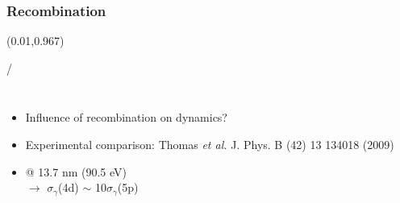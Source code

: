\documentclass{beamer}
\makeatletter
\newcommand{\framenumber}{
\begin{textblock}{0}(0.01,0.967)
\begin{scriptsize}
{\color{gray}\insertframenumber/\inserttotalframenumber}
\end{scriptsize}
\end{textblock}
}
\makeatother
\begin{document}
\subsubsection{Recombination}
\begin{frame}{}\framenumber{}
   \begin{columns}
       \begin{itemize}
           \item Influence of recombination on dynamics?
           \item Experimental comparison: Thomas \textit{et al.} J. Phys. B (42) 13 134018 (2009)
           \item<2-> @ 13.7 nm (90.5 eV) \\ $\rightarrow$ $\sigma_\gamma$(4d) $\sim$ 10$\sigma_\gamma$(5p)
       \end{itemize}



\end{columns}
\end{frame}
\end{document}

